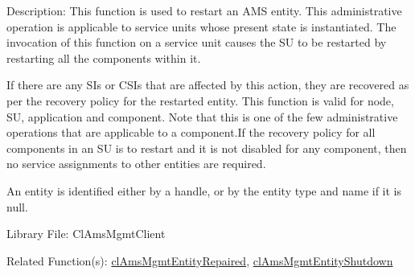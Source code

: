 \begin{Desc}
\item[Description:]This function is used to restart an AMS entity. This administrative operation is applicable to service units whose present 
state is instantiated. The invocation of this function on a service unit causes the SU to be restarted by restarting all the components within it.\par
 \par
 If there are any SIs or CSIs that are affected by this action, they are recovered as per the recovery policy for the restarted entity. 
 This function is valid for node, SU, application and component. Note that this is one of the few administrative operations that are applicable to a component.If the recovery policy for all components in an SU is to restart and it is not disabled for any component, then no service assignments to other entities are required. \par
 \par
 An entity is identified either by a handle, or by the entity type and name if it is null.\end{Desc}
\begin{Desc}
\item[Library File:]Cl\-Ams\-Mgmt\-Client\end{Desc}
\begin{Desc}
\item[Related Function(s):]\hyperlink{pageams115}{cl\-Ams\-Mgmt\-Entity\-Repaired}, \hyperlink{pageams113}{cl\-Ams\-Mgmt\-Entity\-Shutdown} \end{Desc}

\newpage
